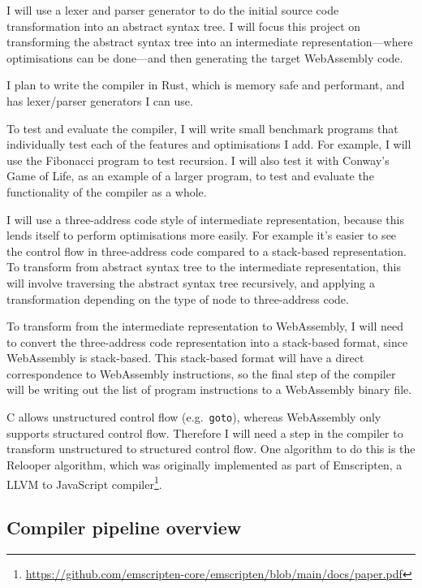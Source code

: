 \documentclass[12pt,a4paper]{article}
\begin{document}
I will use a lexer and parser generator to do the initial source code transformation into an abstract syntax tree.
I will focus this project on transforming the abstract syntax tree into an intermediate representation---where optimisations can be done---and then generating the target WebAssembly code.

I plan to write the compiler in Rust, which is memory safe and performant, and has lexer/parser generators I can use.

To test and evaluate the compiler, I will write small benchmark programs that individually test each of the features and optimisations I add. For example, I will use the Fibonacci program to test recursion.
I will also test it with Conway's Game of Life, as an example of a larger program, to test and evaluate the functionality of the compiler as a whole.


I will use a three-address code style of intermediate representation, because this lends itself to perform optimisations more easily. For example it's easier to see the control flow in three-address code compared to a stack-based representation.
To transform from abstract syntax tree to the intermediate representation, this will involve traversing the abstract syntax tree recursively, and applying a transformation depending on the type of node to three-address code.



To transform from the intermediate representation to WebAssembly, I will need to convert the three-address code representation into a stack-based format, since WebAssembly is stack-based. This stack-based format will have a direct correspondence to WebAssembly instructions, so the final step of the compiler will be writing out the list of program instructions to a WebAssembly binary file.

C allows unstructured control flow (e.g.\ \texttt{goto}), whereas WebAssembly only supports structured control flow. Therefore I will need a step in the compiler to transform unstructured to structured control flow. One algorithm to do this is the Relooper algorithm, which was originally implemented as part of Emscripten, a LLVM to JavaScript compiler\footnote{\url{https://github.com/emscripten-core/emscripten/blob/main/docs/paper.pdf}}.

\subsection*{Compiler pipeline overview}
\end{document}
